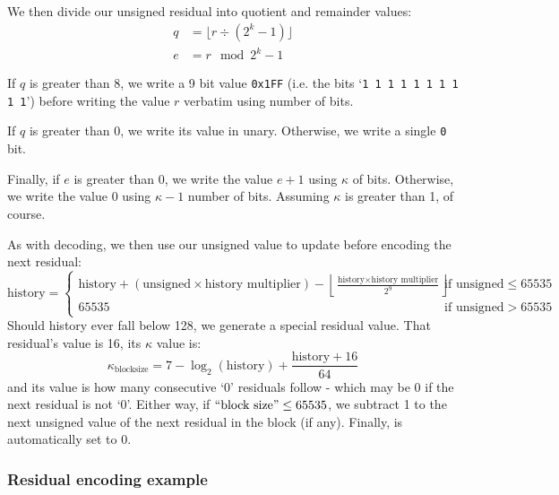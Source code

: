 We then divide our unsigned residual into quotient and remainder values:
\begin{align*}
q &= \lfloor r \div (2^k - 1) \rfloor \\
e &= r\mod{2^k - 1}
\end{align*}

If $q$ is greater than 8, we write a 9 bit value \texttt{0x1FF}
(i.e. the bits `\texttt{1 1 1 1 1 1 1 1 1 1}')
before writing the value $r$ verbatim using 
number of bits.

If $q$ is greater than 0, we write its value in unary.
Otherwise, we write a single \texttt{0} bit.

Finally, if $e$ is greater than 0, we write the value
$e + 1$ using $\kappa$ of bits.
Otherwise, we write the value 0 using $\kappa - 1$ number of bits.
Assuming $\kappa$ is greater than 1, of course.

\clearpage

As with decoding, we then use our unsigned value to update 
before encoding the next residual:
{
\begin{equation*}
\text{history} =
\begin{cases}
\text{history} + (\text{unsigned} \times \text{history multiplier}) - \left\lfloor\frac{\text{history} \times \text{history multiplier}}{2^9}\right\rfloor & \text{if unsigned} \leq 65535 \\
65535 & \text{if unsigned} > 65535
\end{cases}
\end{equation*}
}
Should history ever fall below 128, we generate a special
residual value.
That residual's  value is 16, its
$\kappa$ value is:
\begin{equation}
\kappa_{\text{blocksize}} = 7 - \log_2(\text{history}) + \frac{\text{history} + 16}{64}
\end{equation}
and its value is how many consecutive `0' residuals follow -
which may be 0 if the next residual is not `0'.
Either way, if $\text{``{block size}''} \leq 65535$, we
subtract 1 to the next unsigned value of the next residual in the block
(if any).  Finally,  is automatically set to 0.

\subsubsection{Residual encoding example}

